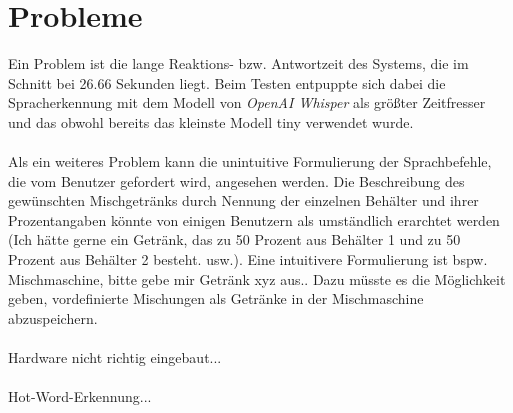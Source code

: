\section{Probleme}
Ein Problem ist die lange Reaktions- bzw. Antwortzeit des Systems, die im Schnitt bei 26.66 Sekunden liegt. Beim Testen entpuppte sich dabei die Spracherkennung mit dem Modell von \textit{OpenAI Whisper} als größter Zeitfresser und das obwohl bereits das kleinste Modell \glqq{}tiny\grqq{} verwendet wurde.\\\\
Als ein weiteres Problem kann die unintuitive Formulierung der Sprachbefehle, die vom Benutzer gefordert wird, angesehen werden. Die Beschreibung des gewünschten Mischgetränks durch Nennung der einzelnen Behälter und ihrer Prozentangaben könnte von einigen Benutzern als umständlich erarchtet werden (\glqq{}Ich hätte gerne ein Getränk, das zu 50 Prozent aus Behälter 1 und zu 50 Prozent aus Behälter 2 besteht.\grqq{} usw.). Eine intuitivere Formulierung ist bspw. \glqq{}Mischmaschine, bitte gebe mir Getränk xyz aus.\grqq{}. Dazu müsste es die Möglichkeit geben, vordefinierte Mischungen als Getränke in der Mischmaschine abzuspeichern.\\\\
Hardware nicht richtig eingebaut...\\\\
Hot-Word-Erkennung... 
